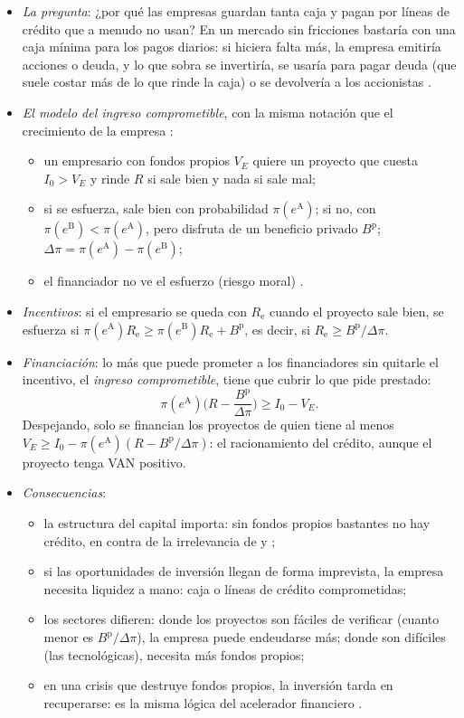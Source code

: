\documentclass[11pt]{article}
\begin{document}
\begin{itemize}
\item \emph{La pregunta}: ¿por qué las empresas guardan tanta caja y pagan por líneas de crédito que a menudo no usan? En un mercado sin fricciones bastaría con una caja mínima para los pagos diarios: si hiciera falta más, la empresa emitiría acciones o deuda, y lo que sobra se invertiría, se usaría para pagar deuda (que suele costar más de lo que rinde la caja) o se devolvería a los accionistas\nocite{HolmstromTirole2011Inside} .
\item \emph{El modelo del ingreso comprometible}\nocite{HolmstromTirole1997Financial,Tirole2006Theory}, con la misma notación que el crecimiento de la empresa :
  \begin{itemize}
  \item un empresario con fondos propios $V_E$ quiere un proyecto que cuesta $I_0>V_E$ y rinde $R$ si sale bien y nada si sale mal;
  \item si se esfuerza, sale bien con probabilidad $\pi(e^{\mathrm A})$; si no, con $\pi(e^{\mathrm B})<\pi(e^{\mathrm A})$, pero disfruta de un beneficio privado $B^{\mathrm p}$; $\Delta\pi=\pi(e^{\mathrm A})-\pi(e^{\mathrm B})$;
  \item el financiador no ve el esfuerzo (riesgo moral) .
  \end{itemize}
\item \emph{Incentivos}: si el empresario se queda con $R_{\mathrm e}$ cuando el proyecto sale bien, se esfuerza si $\pi(e^{\mathrm A})R_{\mathrm e}\geq\pi(e^{\mathrm B})R_{\mathrm e}+B^{\mathrm p}$, es decir, si $R_{\mathrm e}\geq B^{\mathrm p}/\Delta\pi$.
\item \emph{Financiación}: lo más que puede prometer a los financiadores sin quitarle el incentivo, el \emph{ingreso comprometible}, tiene que cubrir lo que pide prestado:
  \[
  \pi(e^{\mathrm A})\Big(R-\frac{B^{\mathrm p}}{\Delta\pi}\Big)\geq I_0-V_E.
  \]
  Despejando, solo se financian los proyectos de quien tiene al menos $V_E\geq I_0-\pi(e^{\mathrm A})(R-B^{\mathrm p}/\Delta\pi)$: el racionamiento del crédito, aunque el proyecto tenga VAN positivo.\findemo
\item \emph{Consecuencias}:
  \begin{itemize}
  \item la estructura del capital importa: sin fondos propios bastantes no hay crédito, en contra de la irrelevancia de  y ;
  \item si las oportunidades de inversión llegan de forma imprevista, la empresa necesita liquidez a mano: caja o líneas de crédito comprometidas;
  \item los sectores difieren: donde los proyectos son fáciles de verificar (cuanto menor es $B^{\mathrm p}/\Delta\pi$), la empresa puede endeudarse más; donde son difíciles (las tecnológicas), necesita más fondos propios;
  \item en una crisis que destruye fondos propios, la inversión tarda en recuperarse: es la misma lógica del acelerador financiero .
  \end{itemize}
\end{itemize}
\end{document}
